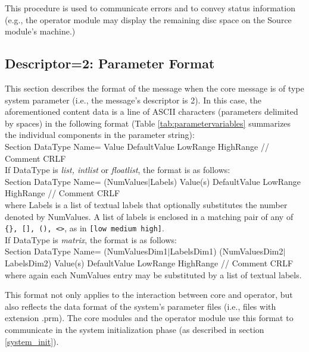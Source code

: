 \documentclass[letterpaper,oneside,12pt]{book}
\begin{document}
This procedure is used to communicate errors and to convey status information (e.g.,
the operator module may display the remaining disc space on the Source module's
machine.)

\subsection{Descriptor=2: Parameter Format}
\label{parameter_format}

This section describes the format of the message when the core message is of 
type system parameter (i.e., the message's descriptor is 2). In this case, the 
aforementioned content data is a line of ASCII characters (parameters delimited 
by spaces) in the following format (Table \ref{tab:parametervariables} summarizes
the individual components in the parameter string):
\\[2ex]
Section DataType Name= Value DefaultValue LowRange HighRange // Comment CRLF \\[2ex]
If DataType is \textit{list, intlist} or \textit{floatlist}, the format is
as follows: 
\\[2ex]
Section DataType Name= (NumValues$\mid${Labels}) Value(s) DefaultValue LowRange HighRange // Comment CRLF \\[2ex]
where Labels is a list of textual labels that optionally substitutes the number denoted by NumValues. A list of labels is enclosed in a matching pair of any of \verb|{}, [], (), <>|, as in 
\verb|[low medium high]|.
\\[2ex]
If DataType is \textit{matrix}, the format is as follows:
\\[2ex]
Section DataType Name= (NumValuesDim1$\mid$LabelsDim1) (NumValuesDim2$\mid$LabelsDim2) Value(s) DefaultValue LowRange HighRange // Comment CRLF \\[2ex]
where again each NumValues entry may be substituted by a list of textual labels.

This format not only applies to the interaction between core and operator, but
also reflects the data format of the system's parameter files (i.e., files with
extension .prm). The core modules and the operator module use this format to
communicate in the system initialization phase (as described in section \ref{system_init}).
\end{document}
